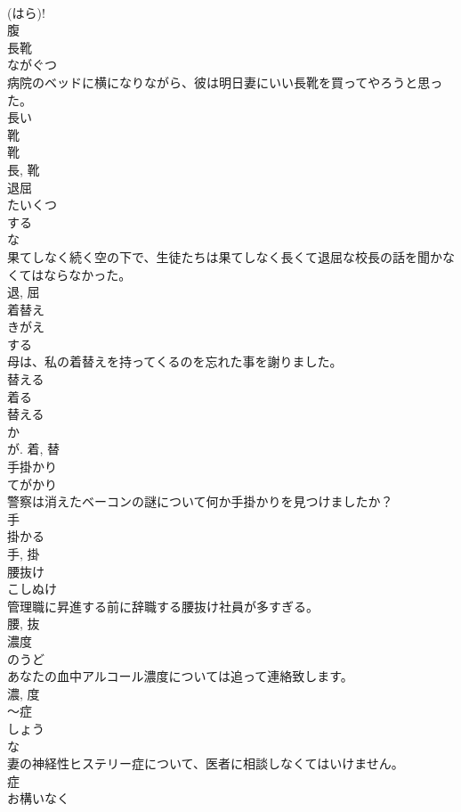 \documentclass[8pt]{extreport}
\begin{document}
\begin{CJK}{UTF8}{min}
\\	(はら)! 
\\	腹	
\\	長靴	
\\	ながぐつ	
\\	病院のベッドに横になりながら、彼は明日妻にいい長靴を買ってやろうと思った。	
\\	長い 
\\	靴 
\\	靴 
\\	長, 靴	
\\	退屈	
\\	たいくつ	
\\	する 
\\	な 
\\	果てしなく続く空の下で、生徒たちは果てしなく長くて退屈な校長の話を聞かなくてはならなかった。	
\\	退, 屈	
\\	着替え	
\\	きがえ	
\\	する 
\\	母は、私の着替えを持ってくるのを忘れた事を謝りました。	
\\	替える 
\\	着る 
\\	替える 
\\	か 
\\	が.	着, 替	
\\	手掛かり	
\\	てがかり	
\\	警察は消えたベーコンの謎について何か手掛かりを見つけましたか？	
\\	手 
\\	掛かる 
\\	手, 掛	
\\	腰抜け	
\\	こしぬけ	
\\	管理職に昇進する前に辞職する腰抜け社員が多すぎる。	
\\	腰, 抜	
\\	濃度	
\\	のうど	
\\	あなたの血中アルコール濃度については追って連絡致します。	
\\	濃, 度	
\\	〜症	
\\	しょう	
\\	な 
\\	妻の神経性ヒステリー症について、医者に相談しなくてはいけません。	
\\	症	
\\	お構いなく	

\end{CJK}
\end{document}
